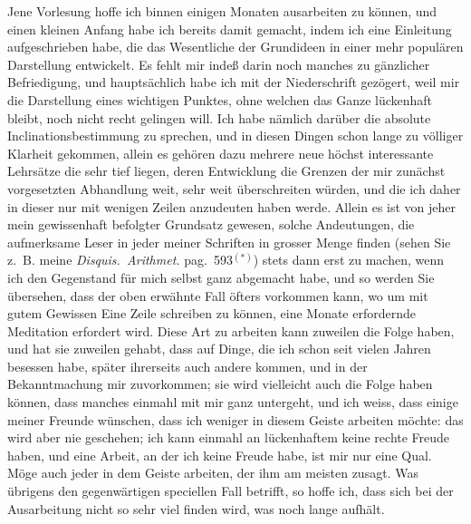 \documentclass[12pt,a4paper]{article}
\begin{document}
Jene Vorlesung hoffe ich binnen einigen Monaten ausarbeiten zu k\"onnen, und einen kleinen Anfang habe ich bereits damit gemacht, indem ich eine Einleitung aufgeschrieben habe, die das Wesentliche der Grundideen in einer mehr popul\"aren Darstellung entwickelt. Es fehlt mir inde\ss{} darin noch manches zu g\"anzlicher Befriedigung, und haupts\"achlich habe ich mit der Niederschrift gez\"ogert, weil mir die Darstellung eines wichtigen Punktes, ohne welchen das Ganze l\"uckenhaft bleibt, noch nicht recht gelingen will. Ich habe n\"amlich dar\"uber die absolute Inclinationsbestimmung zu sprechen, und in diesen Dingen schon lange zu v\"olliger Klarheit gekommen, allein es geh\"oren dazu mehrere neue h\"ochst interessante Lehrs\"atze die sehr tief liegen, deren Entwicklung die Grenzen der mir zun\"achst vorgesetzten Abhandlung weit, sehr weit \"uberschreiten w\"urden, und die ich daher in dieser nur mit wenigen Zeilen anzudeuten haben werde. Allein es ist von jeher mein gewissenhaft befolgter Grundsatz gewesen, solche Andeutungen, die aufmerksame Leser in jeder meiner Schriften in grosser Menge finden (sehen Sie z.~B. meine \textit{Disquis.~Arithmet.} pag.~593$^{(*)}$) stets dann erst zu machen, wenn ich den Gegenstand f\"ur mich selbst ganz abgemacht habe, und so werden Sie \"ubersehen, dass der oben erw\"ahnte Fall \"ofters vorkommen kann, wo um mit gutem Gewissen Eine Zeile schreiben zu k\"onnen, eine Monate erfordernde Meditation erfordert wird. Diese Art zu arbeiten kann zuweilen die Folge haben, und hat sie zuweilen gehabt, dass auf Dinge, die ich schon seit vielen Jahren besessen habe, sp\"ater ihrerseits auch andere kommen, und in der Bekanntmachung mir zuvorkommen; sie wird vielleicht auch die Folge haben k\"onnen, dass manches einmahl mit mir ganz untergeht, und ich weiss, dass einige meiner Freunde w\"unschen, dass ich weniger in diesem Geiste arbeiten m\"ochte: das wird aber nie geschehen; ich kann einmahl an l\"uckenhaftem keine rechte Freude haben, und eine Arbeit, an der ich keine Freude habe, ist mir nur eine Qual. M\"oge auch jeder in dem Geiste arbeiten, der ihm am meisten zusagt. Was \"ubrigens den gegenw\"artigen speciellen Fall betrifft, so hoffe ich, dass sich bei der Ausarbeitung nicht so sehr viel finden wird, was noch lange aufh\"alt.
\end{document}
